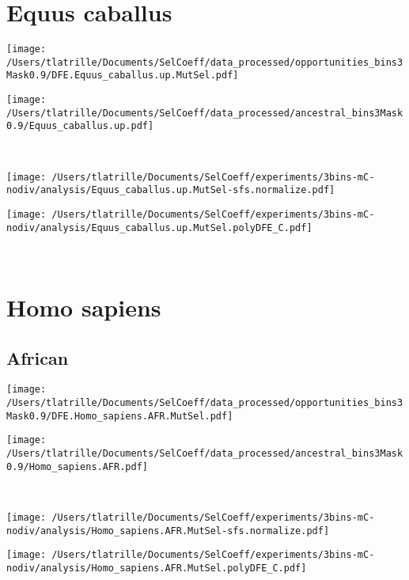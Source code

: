 \documentclass{article}
\begin{document}
    \section{Equus caballus}

    \begin{minipage}{0.49\linewidth}
        \texttt{[image: /Users/tlatrille/Documents/SelCoeff/data\_processed/opportunities\_bins3Mask0.9/DFE.Equus\_caballus.up.MutSel.pdf]}
    \end{minipage}
    \begin{minipage}{0.49\linewidth}
        \texttt{[image: /Users/tlatrille/Documents/SelCoeff/data\_processed/ancestral\_bins3Mask0.9/Equus\_caballus.up.pdf]}
    \end{minipage}
    \\
    \begin{minipage}{0.49\linewidth}
        \texttt{[image: /Users/tlatrille/Documents/SelCoeff/experiments/3bins-mC-nodiv/analysis/Equus\_caballus.up.MutSel-sfs.normalize.pdf]}
    \end{minipage}
    \begin{minipage}{0.49\linewidth}
        \texttt{[image: /Users/tlatrille/Documents/SelCoeff/experiments/3bins-mC-nodiv/analysis/Equus\_caballus.up.MutSel.polyDFE\_C.pdf]}
    \end{minipage}
    \\
    \section{Homo sapiens}

    \subsection{African}

    \begin{minipage}{0.49\linewidth}
        \texttt{[image: /Users/tlatrille/Documents/SelCoeff/data\_processed/opportunities\_bins3Mask0.9/DFE.Homo\_sapiens.AFR.MutSel.pdf]}
    \end{minipage}
    \begin{minipage}{0.49\linewidth}
        \texttt{[image: /Users/tlatrille/Documents/SelCoeff/data\_processed/ancestral\_bins3Mask0.9/Homo\_sapiens.AFR.pdf]}
    \end{minipage}
    \\
    \begin{minipage}{0.49\linewidth}
        \texttt{[image: /Users/tlatrille/Documents/SelCoeff/experiments/3bins-mC-nodiv/analysis/Homo\_sapiens.AFR.MutSel-sfs.normalize.pdf]}
    \end{minipage}
    \begin{minipage}{0.49\linewidth}
        \texttt{[image: /Users/tlatrille/Documents/SelCoeff/experiments/3bins-mC-nodiv/analysis/Homo\_sapiens.AFR.MutSel.polyDFE\_C.pdf]}
    \end{minipage}
    \\
\end{document}
